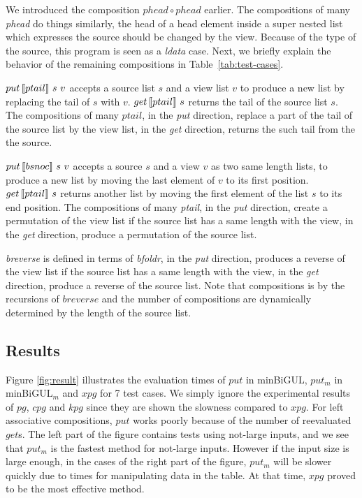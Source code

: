 We introduced the composition $phead \circ phead$ earlier. The compositions of many \textit{phead} do things similarly, the head of a head element inside a super nested list which expresses the source should be changed by the view. Because of the type of the source, this program is seen as a \textit{ldata} case. Next, we briefly explain the behavior of the remaining compositions in Table~\ref{tab:test-cases}.

$put \, [\![ptail]\!] \ s \ v$ accepts a source list $s$ and a view list $v$ to produce a new list by replacing the tail of $s$ with $v$. $get \, [\![ptail]\!] \ s$ returns the tail of the source list $s$. The compositions of many $ptail$, in the \textit{put} direction, replace a part of the tail of the source list by the view list, in the \textit{get} direction, returns the such tail from the the source.

$put \, [\![bsnoc]\!] \ s \ v$ accepts a source $s$ and a view $v$ as two same length lists, to produce a new list by moving the last element of $v$ to its first position. $get \, [\![ptail]\!] \ s$ returns another list by moving the first element of the list $s$ to its end position. The compositions of many \textit{ptail}, in the \textit{put} direction, create a permutation of the view list if the source list has a same length with the view, in the \textit{get} direction, produce a permutation of the source list.

\textit{breverse} is defined in terms of \textit{bfoldr}, in the \textit{put} direction, produces a reverse of the view list if the source list has a same length with the view, in the \textit{get} direction, produce a reverse of the source list. Note that compositions is by the recursions of $breverse$ and 
the number of compositions are dynamically determined by the length of the source list.

\subsection{Results}



Figure \ref{fig:result} illustrates the evaluation times of $put$ in minBiGUL, $put_m$ in minBiGUL$_m$ and $xpg$ for 7 test cases. We simply ignore the experimental results of $pg$, $cpg$ and $kpg$ since they are shown the slowness compared to $xpg$. For left associative compositions, $put$ works poorly because of the number of reevaluated $get$s.
The left part of the figure contains tests using not-large inputs, and we see that $put_m$ is the fastest method for not-large inputs. However if the input size is large enough, in the cases of the right part of the figure, $put_m$ will be slower quickly due to times for manipulating data in the table. At that time, $xpg$ proved to be the most effective method.
